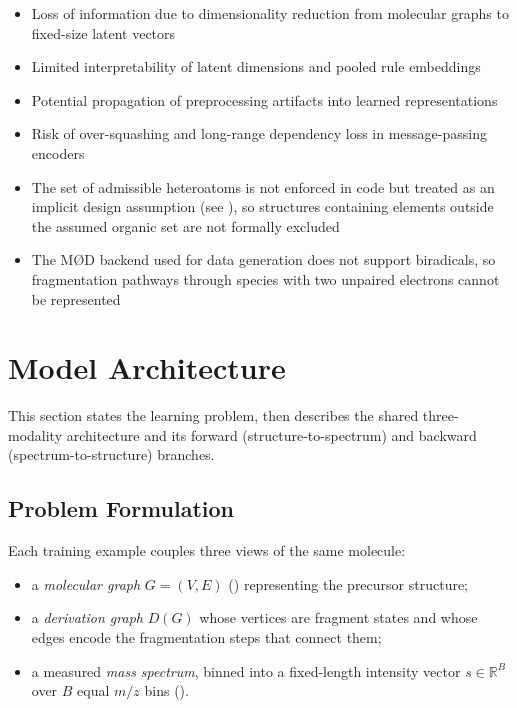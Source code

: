 \begin{itemize}
    \item Loss of information due to dimensionality reduction from molecular graphs to fixed-size latent vectors
    \item Limited interpretability of latent dimensions and pooled rule embeddings
    \item Potential propagation of preprocessing artifacts into learned representations
    \item Risk of over-squashing and long-range dependency loss in message-passing encoders
    \item The set of admissible heteroatoms is not enforced in code but treated as an implicit design assumption (see ), so structures containing elements outside the assumed organic set are not formally excluded
    \item The M\O D backend used for data generation does not support biradicals, so fragmentation pathways through species with two unpaired electrons cannot be represented
\end{itemize}


\section{Model Architecture}

This section states the learning problem, then describes the shared three-modality architecture and its forward (structure-to-spectrum) and backward (spectrum-to-structure) branches.

\subsection{Problem Formulation}
\label{sec:problem-formulation}

Each training example couples three views of the same molecule:
\begin{itemize}
    \item a \emph{molecular graph} $G=(V,E)$ () representing the precursor structure;
    \item a \emph{derivation graph} $D(G)$ whose vertices are fragment states and whose edges encode the fragmentation steps that connect them;
    \item a measured \emph{mass spectrum}, binned into a fixed-length intensity vector $s \in \mathbb{R}^{B}$ over $B$ equal $m/z$ bins ().
\end{itemize}

